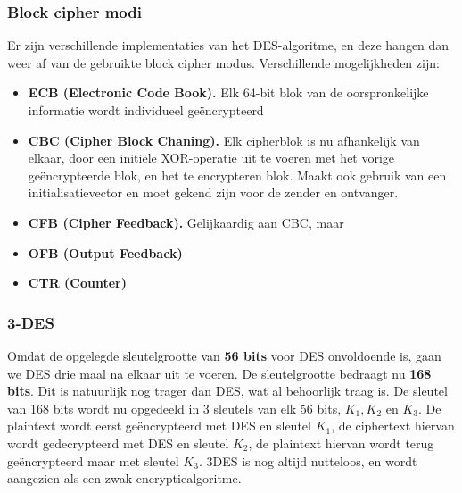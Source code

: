 \documentclass{report}
\begin{document}
	\subsubsection{Block cipher modi}
	Er zijn verschillende implementaties van het DES-algoritme, en deze hangen dan weer af van de gebruikte block cipher modus. Verschillende mogelijkheden zijn:
	\begin{itemize}
		\item \textbf{ECB (Electronic Code Book).} Elk 64-bit blok van de oorspronkelijke informatie wordt individueel geëncrypteerd
		\item \textbf{CBC (Cipher Block Chaning).} Elk cipherblok is nu afhankelijk van elkaar, door een initiële XOR-operatie uit te voeren met het vorige geëncrypteerde blok, en het te encrypteren blok. Maakt ook gebruik van een initialisatievector en moet gekend zijn voor de zender en ontvanger.
		\item \textbf{CFB (Cipher Feedback).} Gelijkaardig aan CBC, maar 
		\item \textbf{OFB (Output Feedback)} 
		\item \textbf{CTR (Counter)}
	\end{itemize}
	\subsubsection{3-DES}
	Omdat de opgelegde sleutelgrootte van \textbf{56 bits} voor DES onvoldoende is, gaan we DES drie maal na elkaar uit te voeren. De sleutelgrootte bedraagt nu \textbf{168 bits}. Dit is natuurlijk nog trager dan DES, wat al behoorlijk traag is. De sleutel van 168 bits wordt nu opgedeeld in 3 sleutels van elk 56 bits, $K_1, K_2$ en $K_3$. De plaintext wordt eerst geëncrypteerd met DES en sleutel $K_1$, de ciphertext hiervan wordt gedecrypteerd met DES en sleutel $K_2$, de plaintext hiervan wordt terug geëncrypteerd maar met sleutel $K_3$. 3DES is nog altijd nutteloos, en wordt aangezien als een zwak encryptiealgoritme. 
\end{document}
